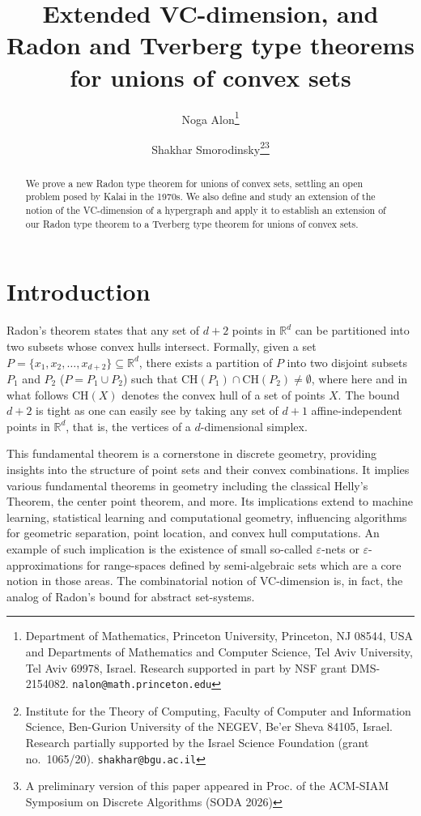 \documentclass[11pt]{article}
\def\Re{\mathbb R}
\def\epsilon{{\varepsilon}}
\theoremstyle{plain}
\theoremstyle{definition}
\theoremstyle{remark}
\begin{document}
	
\title{Extended VC-dimension, and  Radon and Tverberg type theorems for unions of convex sets}
\author{Noga Alon\thanks{Department of Mathematics, 
Princeton University, Princeton, NJ 08544, USA and
Departments of Mathematics and Computer Science, Tel Aviv University,
Tel Aviv 69978, Israel.
Research supported in part by NSF grant DMS-2154082.
\texttt{nalon@math.princeton.edu}} 
\and Shakhar Smorodinsky\thanks{Institute for the Theory of Computing, Faculty of Computer and Information Science,
 Ben-Gurion University of the NEGEV, Be'er Sheva 84105, Israel.
Research partially supported by the Israel Science 
Foundation (grant no.~1065/20).  \texttt{shakhar@bgu.ac.il}}\thanks{A preliminary version of this paper appeared in Proc. of the ACM-SIAM Symposium on Discrete Algorithms (SODA 2026)}}
	
	\date{}
	\maketitle

\begin{abstract}
  We prove a new Radon type theorem for unions of convex sets,
settling an open problem posed by Kalai in the 1970s. We also define 
	and study an extension of the notion of the VC-dimension of a 
	hypergraph and apply it to establish an extension of our 
	Radon type theorem to a Tverberg type theorem 
	for unions of convex sets. 
\end{abstract}
		
	
\section{Introduction} \label{sec:intro}
Radon's theorem states that any set of $d+2$ points in $\Re^d$ can
be partitioned into two subsets whose convex hulls intersect. Formally,
given a set $P = \{x_1, x_2, \ldots, x_{d+2}\} \subseteq \mathbb{R}^d$,
there exists a partition of $P$ into two disjoint subsets $P_1$ and $P_2$
($P= P_1 \cup P_2$) such that  $\text{CH}(P_1) \cap \text{CH}(P_2)
\neq \emptyset$, where here and in what follows $\text{CH}(X)$ denotes the convex hull of a set of points $X$. The bound $d+2$ is tight as one 
can easily see by taking any set of $d+1$ affine-independent points 
in $\Re^d$, that is, the vertices of a $d$-dimensional simplex.

This fundamental theorem is a cornerstone in discrete
geometry, providing insights into the structure of point sets and their
convex combinations. It implies various fundamental theorems in geometry including the classical Helly's Theorem, the center point theorem, and more.
Its implications extend to machine learning, statistical learning and computational geometry,
influencing algorithms for geometric separation, point location, and
convex hull computations. An example of such implication is the existence of small so-called $\epsilon$-nets or $\epsilon$-approximations for range-spaces defined by semi-algebraic sets which are a core notion in those areas.
The combinatorial notion of VC-dimension is, in fact, the analog of Radon's bound for abstract set-systems.
\end{document}
